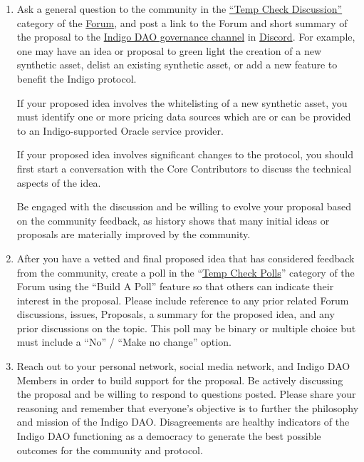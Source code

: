 \begin{enumerate}
\item
  Ask a general question to the community in the
  \href{https://forum.indigoprotocol.io/c/general-discussion/8}{``Temp
  Check Discussion''} category of the
  \href{https://forum.indigoprotocol.io/}{Forum}, and post a link to the
  Forum and short summary of the proposal to the
  \href{https://discord.com/channels/816779565796032513/934082020454309888}{Indigo
  DAO governance channel} in
  \href{https://discord.gg/indigoprotocol}{Discord}. For example, one
  may have an idea or proposal to green light the creation of a new
  synthetic asset, delist an existing synthetic asset, or add a new
  feature to benefit the Indigo protocol.

  If your proposed idea involves the whitelisting of a new synthetic
  asset, you must identify one or more pricing data sources which are or
  can be provided to an Indigo-supported Oracle service provider.

  If your proposed idea involves significant changes to the protocol,
  you should first start a conversation with the Core Contributors to
  discuss the technical aspects of the idea.

  Be engaged with the discussion and be willing to evolve your proposal
  based on the community feedback, as history shows that many initial
  ideas or proposals are materially improved by the community.
\item
  After you have a vetted and final proposed idea that has considered
  feedback from the community, create a poll in the
  ``\href{https://forum.indigoprotocol.io/c/polls/11}{Temp Check
  Polls}'' category of the Forum using the ``Build A Poll'' feature so
  that others can indicate their interest in the proposal. Please
  include reference to any prior related Forum discussions, issues,
  Proposals, a summary for the proposed idea, and any prior discussions
  on the topic. This poll may be binary or multiple choice but must
  include a ``No'' / ``Make no change'' option.
\item
  Reach out to your personal network, social media network, and Indigo
  DAO Members in order to build support for the proposal. Be actively
  discussing the proposal and be willing to respond to questions posted.
  Please share your reasoning and remember that everyone's objective is
  to further the philosophy and mission of the Indigo DAO. Disagreements
  are healthy indicators of the Indigo DAO functioning as a democracy to
  generate the best possible outcomes for the community and protocol.
\end{enumerate}

